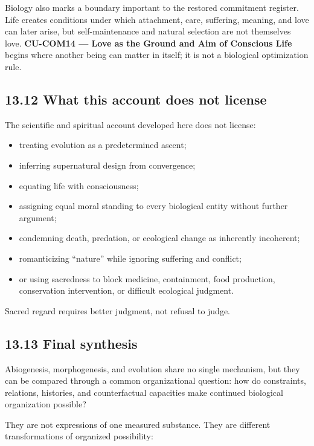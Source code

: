 \documentclass[
  11pt,
]{article}
\providecommand{\tightlist}{%
  \setlength{\itemsep}{0pt}\setlength{\parskip}{0pt}}
\begin{document}
Biology also marks a boundary important to the restored commitment
register. Life creates conditions under which attachment, care,
suffering, meaning, and love can later arise, but self-maintenance and
natural selection are not themselves love. \textbf{CU-COM14 --- Love as
the Ground and Aim of Conscious Life} begins where another being can
matter in itself; it is not a biological optimization rule.

\subsection{13.12 What this account does not
license}\label{what-this-account-does-not-license}

The scientific and spiritual account developed here does not license:

\begin{itemize}
\tightlist
\item
  treating evolution as a predetermined ascent;
\item
  inferring supernatural design from convergence;
\item
  equating life with consciousness;
\item
  assigning equal moral standing to every biological entity without
  further argument;
\item
  condemning death, predation, or ecological change as inherently
  incoherent;
\item
  romanticizing ``nature'' while ignoring suffering and conflict;
\item
  or using sacredness to block medicine, containment, food production,
  conservation intervention, or difficult ecological judgment.
\end{itemize}

Sacred regard requires better judgment, not refusal to judge.

\subsection{13.13 Final synthesis}\label{final-synthesis}

Abiogenesis, morphogenesis, and evolution share no single mechanism, but
they can be compared through a common organizational question: how do
constraints, relations, histories, and counterfactual capacities make
continued biological organization possible?

They are not expressions of one measured substance. They are different
transformations of organized possibility:
\end{document}
